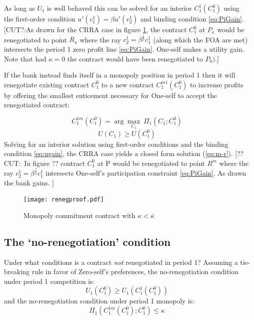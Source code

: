 \documentclass[11pt,english]{article}
\theoremstyle{plain}
\theoremstyle{definition}
\begin{document}
As long as $U_{1}$ is well behaved this can be solved for
an interior $C_{1}^{1}(C_{1}^{0})$ using the first-order condition
$u'(c_{1}^{1})=\beta u'(c_{2}^{1})$ and binding condition \ref{eq:PiGain}.
[CUT?:As drawn for the CRRA case in figure \ref{fig:renegproof}, the contract $C_{1}^{0}$
at $P_{\kappa}$ would be renegotiated to point $R_{\kappa}$ where the ray 
$c_{2}^{1}=\beta^{\frac{1}{\rho}}c_{1}^{1}$
(along which the FOA are met) intersects the period 1 zero profit
line \ref{eq:PiGain}. One-self makes a utility gain. Note that had
$\kappa=0$ the contract would have been renegotiated to $P_{0}).]$

If the bank instead finds itself in a monopoly position in period
1 then it will renegotiate existing contract $C_{1}^{0}$ to a new
contract $C_{1}^{m1}(C_{1}^{0})$ to increase profits by offering
the smallest enticement necessary for One-self to accept the renegotiated
contract:

\begin{equation}
C_{1}^{1m}(C_{1}^{0})=\arg\max_{C_{1}}\ \Pi_{1}(C_{1};C_{1}^{0})
\end{equation}
\begin{equation}
U(C_{1})\geq U(C_{1}^{0})\label{eq:ugain}
\end{equation}
Solving for an interior solution using first-order conditions and
the binding condition \ref{eq:ugain}, the CRRA case yields a closed
form solution (\ref{eq:m-r}). [??CUT:\ In figure ?? contract $C_{1}^{0}$
at P would be renegotiated to point $R^{m}$ where the ray $c_{2}^{1}=\beta^{\frac{1}{\rho}}c_{1}^{1}$
intersects One-self's participation constraint \ref{eq:PiGain}. As
drawn the bank gains.
]
\begin{figure}
  \texttt{[image: renegproof.pdf]}
  \caption{Monopoly commitment contract with $\kappa<\bar{\kappa}$}
  \label{fig:renegproof} 
\end{figure}


\subsection{The `no-renegotiation' condition}

\label{sec-no-reneg-cond}

Under what conditions is a contract \textit{not} renegotiated in period 1? Assuming a tie-breaking rule in favor of
Zero-self's preferences, the no-renegotiation condition under period
1 competition is: 
\begin{equation}
U_{1}\left(C_{1}^{0}\right)\geq U_{1}\left(C_{1}^{1}(C_{1}^{0})\right)\label{eq:no-reg-comp}
\end{equation}and the no-renegotiation condition under period 1 monopoly is: 
\begin{equation}
\Pi_{1}(C_{1}^{1m}\left(C_{1}^{0}\right);C_{1}^{0})\leq\kappa\label{eq:no-reg-monop}
\end{equation}
\end{document}
